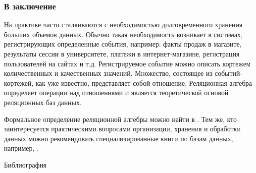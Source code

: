 \appendix


\begin{frame}
    \frametitle{В заключение}
    
    На практике часто сталкиваются с необходимостью долговременного хранения больших объемов данных. Обычно такая необходимость возникает в системах, регистрирующих определенные события, например: факты продаж в магазите, результаты сессии в университете, платежи в интернет-магазине, регистрация пользователей на сайтах и т.д. Регистрируемое событие можно описать кортежем количественных и качественных значений. Множество, состоящее из событий-кортежей, как уже известно, представляет собой отношение. Реляционная алгебра определяет операции над отношениями и является теоретической основой реляционных баз данных. 
    
    Формальное определение реляционной алгебры можно найти в \cite{bib:gorbatovs:discrmath,bib:haggard:discrmathprogrammer}. Тем же, кто заинтересуется практическими вопросами организации, хранения и обработки данных можно рекомендовать специализированные книги по базам данных, например, \cite{bib:krenke:db}.
\end{frame}


\begin{frame}[allowframebreaks]{Библиография}
    
    
\end{frame}

